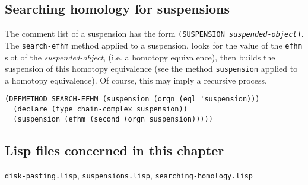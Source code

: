\subsection {Searching homology for suspensions}

The comment list of a suspension has the 
form {\tt (SUSPENSION {\em suspended-object})}.
The {\tt search-efhm} method applied to a suspension, looks for the value of the 
{\tt efhm} slot of the {\em suspended-object}, (i.e. a homotopy equivalence), then
builds the suspension of this homotopy equivalence (see the method {\tt suspension} applied
to a homotopy equivalence). Of course, this may imply a recursive process.
{\footnotesize\begin{verbatim}
(DEFMETHOD SEARCH-EFHM (suspension (orgn (eql 'suspension)))
  (declare (type chain-complex suspension))
  (suspension (efhm (second (orgn suspension)))))
\end{verbatim}}

\subsection* {Lisp files concerned in this chapter}

{\tt disk-pasting.lisp}, {\tt suspensions.lisp}, {\tt searching-homology.lisp}


